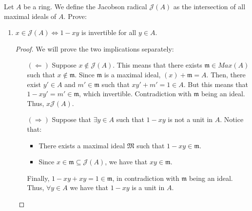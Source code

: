 \begin{problem}
    Let $A$ be a ring.
    We define the Jacobson radical $\mathcal{J}(A)$ as the intersection of all maximal ideals of $A$.
    Prove:
    \begin{enumerate}[label=(\theproblem.\arabic*),ref=\theproblem.\arabic*]

        \item \label{itm:jacobson_element_to_invertible}
        $x \in \mathcal{J}(A) \Leftrightarrow 1-xy$ is invertible for all $y \in A$.
            \begin{sol}
                \begin{proof}
                We will prove the two implications separately:
                    \begin{itemize}
                        \item[$(\Leftarrow)$]
                        Suppose $x \notin \mathcal{J}(A)$.
                        This means that there exists $\mathfrak{m} \in Max(A)$ such that $x \notin \mathfrak{m}$.
                        Since $\mathfrak{m}$ is a maximal ideal, $(x) + \mathfrak{m} = A$.
                        Then, there exist $y' \in A$ and $m' \in \mathfrak{m}$ such that $x y' + m' = 1 \in A$.
                        But this means that $1 - x y' = m' \in \mathfrak{m}$, which invertible.
                        Contradiction with $\mathfrak{m}$ being an ideal.
                        Thus, $x \mathcal{J}(A)$.
                        \item[$(\Rightarrow)$]
                        Suppose that $\exists y \in A$ such that $1-x y$ is not a unit in $A$.
                        Notice that:
                        \begin{itemize}
                            \item There exists a maximal ideal $\mathfrak{M}$ such that $1 - x y \in \mathfrak{m}$.
                            \item Since $x \in \mathfrak{m} \subseteq \mathcal{J}(A)$, we have that $x y \in \mathfrak{m}$.
                        \end{itemize}
                        Finally,  $1 - x y + x y = 1 \in \mathfrak{m}$, in contradiction with $\mathfrak{m}$ being an ideal.
                        Thus, $\forall y \in A$ we have that $1 - x y$ is a unit in $A$.
                    \end{itemize}
                \end{proof}
            \end{sol}


\end{enumerate}
\end{problem}
